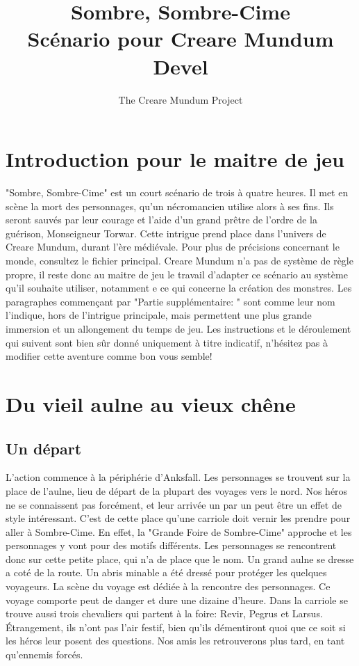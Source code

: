 \documentclass[a4paper, 11pt]{article}
\title{Sombre, Sombre-Cime\\ Scénario pour Creare Mundum \\ Devel}
\author{The Creare Mundum Project}
\date{\oldstylenums{\insertdate}}
\begin{document}
\maketitle
\setcounter{tocdepth}{1} %
\renewcommand{\contentsname}{Sommaire} 
\tableofcontents
\newpage

\section{Introduction pour le maitre de jeu}
"Sombre, Sombre-Cime" est un court scénario de trois à quatre heures. Il met en scène la mort des personnages, qu'un nécromancien utilise alors à ses fins. Ils seront sauvés par leur courage et l'aide d'un grand prêtre de l'ordre de la guérison, Monseigneur Torwar.
\newline
Cette intrigue prend place dans l'univers de Creare Mundum, durant l'ère médiévale. Pour plus de précisions concernant le monde, consultez le fichier principal.
\newline
Creare Mundum n'a pas de système de règle propre, il reste donc au maitre de jeu le travail d'adapter ce scénario au système qu'il souhaite utiliser, notamment e ce qui concerne la création des monstres.
\newline
Les paragraphes commençant par "Partie supplémentaire: " sont comme leur nom l'indique, hors de l'intrigue principale, mais permettent une plus grande immersion et un allongement du temps de jeu.
\newline
Les instructions et le déroulement qui suivent sont bien sûr donné uniquement à titre indicatif, n'hésitez pas à modifier cette aventure comme bon vous semble!

\section{Du vieil aulne au vieux chêne}
\subsection{Un départ}
L'action commence à la périphérie d'Anksfall. Les personnages se trouvent sur la place de l’aulne, lieu de départ de la plupart des voyages vers le nord. Nos héros ne se connaissent pas forcément, et leur arrivée un par un peut être un effet de style intéressant. C'est de cette place qu'une carriole doit vernir les prendre pour aller à Sombre-Cime. En effet, la "Grande Foire de Sombre-Cime" approche et les personnages y vont pour des motifs différents. Les personnages  se rencontrent donc sur cette petite place, qui n'a de place que le nom. Un grand aulne se dresse a coté de la route. Un abris minable a été dressé pour protéger les quelques voyageurs. La scène du voyage est dédiée à la rencontre des personnages. Ce voyage comporte peut de danger et dure une dizaine d'heure. Dans la carriole se trouve aussi trois chevaliers qui partent à la foire: Revir, Pegrus et Larsus. Étrangement, ils n'ont pas l'air festif, bien qu'ils démentiront quoi que ce soit si les héros leur posent des questions. Nos amis les retrouverons plus tard, en tant qu'ennemis forcés.
\end{document}
